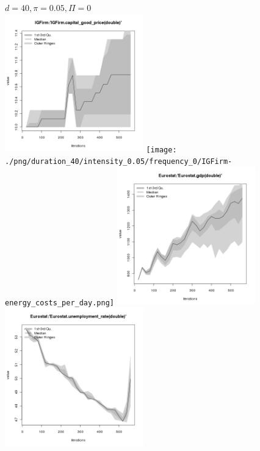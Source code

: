 \begin{figure}[ht!]
\centering\leavevmode
\begin{minipage}{13cm}
\centering\leavevmode
{$d=40, \pi=0.05, \Pi=0$}\\
\includegraphics[width=6cm]{./png/duration_40/intensity_0.05/frequency_0/IGFirm-capital_good_price.png}
\texttt{[image: ./png/duration\_40/intensity\_0.05/frequency\_0/IGFirm-energy\_costs\_per\_day.png]}
\includegraphics[width=6cm]{./png/duration_40/intensity_0.05/frequency_0/Eurostat-gdp.png}
\includegraphics[width=6cm]{./png/duration_40/intensity_0.05/frequency_0/Eurostat-unemployment_rate.png}
\end{minipage}
\end{figure}

